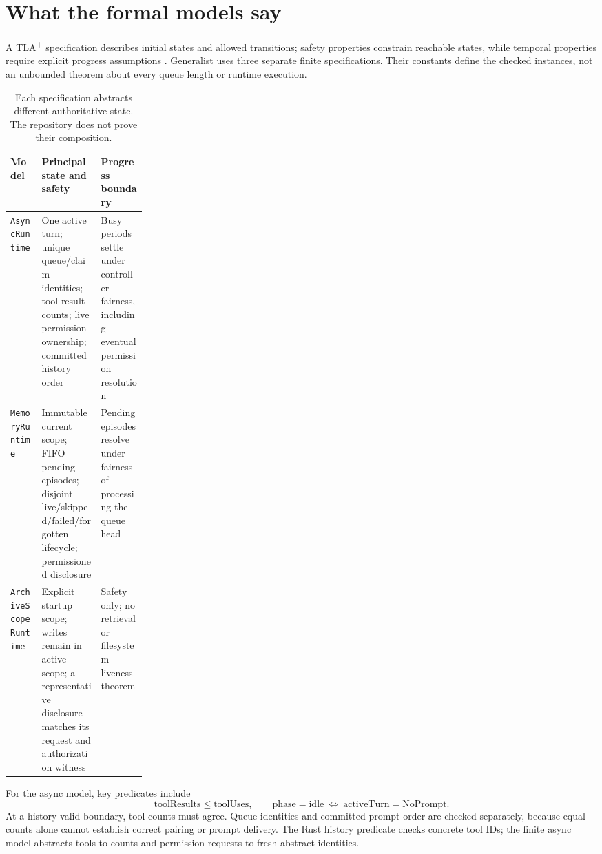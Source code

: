 \documentclass[10pt,letterpaper]{article}
\newcommand{\tla}{TLA\textsuperscript{+}}
\newcommand{\code}[1]{\texttt{#1}}
\begin{document}
\section{What the formal models say}
A \tla{} specification describes initial states and allowed transitions;
safety properties constrain reachable states, while temporal properties require
explicit progress assumptions \cite{lamport2002}. Generalist uses three
separate finite specifications. Their constants define the checked instances,
not an unbounded theorem about every queue length or runtime execution.

\begin{table}[ht]
\small
\begin{tabularx}{\linewidth}{@{}p{0.23\linewidth}YY@{}}
\toprule
Model & Principal state and safety & Progress boundary \\
\midrule
\code{AsyncRuntime} & One active turn; unique queue/claim identities; tool-result counts; live permission ownership; committed history order & Busy periods settle under controller fairness, including eventual permission resolution \\
\code{MemoryRuntime} & Immutable current scope; FIFO pending episodes; disjoint live/skipped/failed/forgotten lifecycle; permissioned disclosure & Pending episodes resolve under fairness of processing the queue head \\
\code{ArchiveScopeRuntime} & Explicit startup scope; writes remain in active scope; a representative disclosure matches its request and authorization witness & Safety only; no retrieval or filesystem liveness theorem \\
\bottomrule
\end{tabularx}
\caption{Each specification abstracts different authoritative state. The repository does not prove their composition.}
\label{tab:models}
\end{table}

For the async model, key predicates include
\[
  \text{toolResults}\leq\text{toolUses},\qquad
  \text{phase}=\text{idle}\ \Longleftrightarrow\
  \text{activeTurn}=\text{NoPrompt}.
\]
At a history-valid boundary, tool counts must agree. Queue identities and
committed prompt order are checked separately, because equal counts alone
cannot establish correct pairing or prompt delivery. The Rust history
predicate checks concrete tool IDs; the finite async model abstracts tools to
counts and permission requests to fresh abstract identities.
\end{document}
